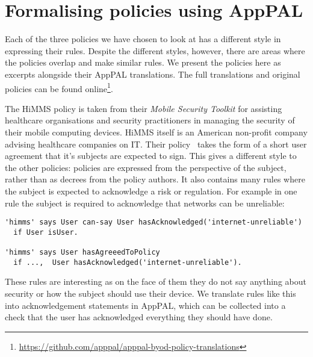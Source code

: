 \documentclass[a4paper]{article}
\begin{document}
\section{Formalising policies using AppPAL}
\label{sec:idea}

Each of the three policies we have chosen to look at has a different style in expressing their rules.
Despite the different styles, however, there are areas where the policies overlap and make similar rules.
We present the policies here as excerpts alongside their AppPAL translations.
The full translations and original policies can be found online\footnote{\url{https://github.com/apppal/apppal-byod-policy-translations}}.

The \ac{HiMMS} policy is taken from their \emph{Mobile Security Toolkit} for assisting healthcare organisations and security practitioners in managing the security of their mobile computing devices. 
\ac{HiMMS} itself is an American non-profit company advising healthcare companies on IT.
Their policy~\cite{healthcare_information_and_management_systems_society_mobile_2012} takes the form of a short user agreement that it's subjects are expected to sign.  
This gives a different style to the other policies: policies are expressed from the perspective of the subject, rather than as decrees from the policy authors.
It also contains many rules where the subject is expected to acknowledge a risk or regulation.  
For example in one rule the subject is required to acknowledge that networks can be unreliable:
\begin{lstlisting}[title={\footnotesize\textbf{\ac{HiMMS}}:~\itshape 
I understand and accept that synchronisation relies on one or more cellular network providers and the Internet, and that both are subject to slowdowns and outages of extended duration that are beyond the control of IT.}]
'himms' says User can-say User hasAcknowledged('internet-unreliable')
  if User isUser.

'himms' says User hasAgreeedToPolicy
  if ...,  User hasAcknowledged('internet-unreliable').
\end{lstlisting}
These rules are interesting as on the face of them they do not say anything about security or how the subject should use their device.
We translate rules like this into acknowledgement statements in AppPAL, which can be collected into a check that the user has acknowledged everything they should have done.
\end{document}
